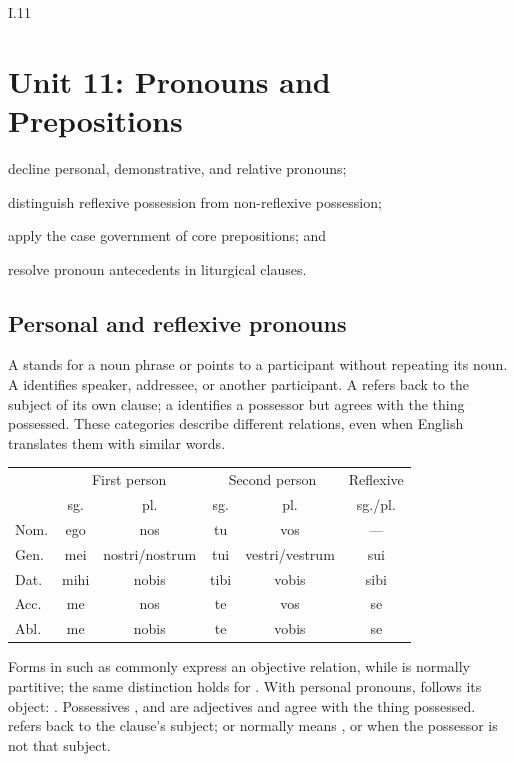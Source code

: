 \begin{courseunit}{I.11}
\chapter{Unit 11: Pronouns and Prepositions}

\begin{learningobjectives}
  \item decline personal, demonstrative, and relative pronouns;
  \item distinguish reflexive possession from non-reflexive possession;
  \item apply the case government of core prepositions; and
  \item resolve pronoun antecedents in liturgical clauses.
\end{learningobjectives}

\section{Personal and reflexive pronouns}

A  stands for a noun phrase or points to a participant without
repeating its noun. A  identifies speaker, addressee, or
another participant. A  refers back to the subject of
its own clause; a  identifies a possessor but agrees
with the thing possessed. These categories describe different relations, even
when English translates them with similar words.

\begin{center}\small
\begin{tabular}{@{}lcc|cc|c@{}}
\toprule
& \multicolumn{2}{c}{First person} & \multicolumn{2}{c}{Second person} & Reflexive \\
& sg. & pl. & sg. & pl. & sg./pl. \\
\midrule
Nom. & ego & nos & tu & vos & --- \\
Gen. & mei & nostri/nostrum & tui & vestri/vestrum & sui \\
Dat. & mihi & nobis & tibi & vobis & sibi \\
Acc. & me & nos & te & vos & se \\
Abl. & me & nobis & te & vobis & se \\
\bottomrule
\end{tabular}
\end{center}

Forms in  such as  commonly express an objective
relation, while  is normally partitive; the same distinction
holds for . With personal pronouns,  follows
its object: . Possessives
, and  are adjectives and agree
with the thing possessed.  refers back to the clause's subject;
 or  normally means , or
 when the possessor is not that subject.


\end{courseunit}
